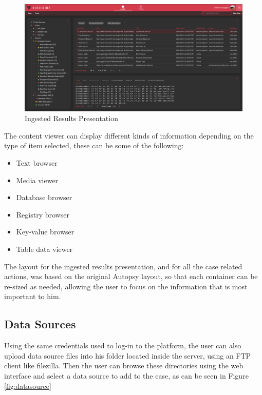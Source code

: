 \begin{figure}[h]
 \centering
 \includegraphics[width=1\linewidth]{imgs/data.png}
 \caption{Ingested Results Presentation}
 \label{fig:data}
\end{figure}

The content viewer can display different kinds of information depending on the type of item selected, these can be some of the following:
\begin{itemize}
 \item Text browser
 \item Media viewer
 \item Database browser
 \item Registry browser
 \item Key-value browser
 \item Table data viewer
\end{itemize}

The layout for the ingested results presentation, and for all the case related actions, was based on the original Autopsy layout, so that each container can be re-sized as
needed, allowing the user to focus on the information that is most important to him.

\subsection{Data Sources}

Using the same credentials used to log-in to the platform, the user can also upload data source files into his folder located inside the server, using an FTP client like filezilla.
Then the user can browse these directories using the web interface and select a data source to add to the case, as can be seen in Figure \ref{fig:datasource}

